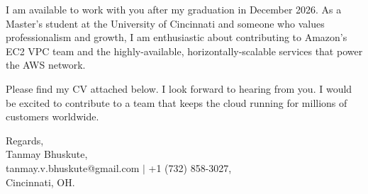 \documentclass[11pt]{letter}
\begin{document}
\begin{letter}{}
I am available to work with you after my graduation in December 2026. As a Master's student at the University of Cincinnati and someone who values professionalism and growth, I am enthusiastic about contributing to Amazon's EC2 VPC team and the highly-available, horizontally-scalable services that power the AWS network.

Please find my CV attached below. I look forward to hearing from you. I would be excited to contribute to a team that keeps the cloud running for millions of customers worldwide.

{\setlength{\parskip}{0pt}
Regards,\\
Tanmay Bhuskute,\\
tanmay.v.bhuskute@gmail.com $\mid$ +1 (732) 858-3027,\\
Cincinnati, OH.
}

\end{letter}
\end{document}

